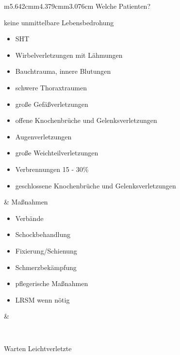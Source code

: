 \documentclass{article}
\begin{document}
\begin{flushleft}
\tablehead{}\begin{supertabular}{m{5.642cm}m{4.379cm}m{3.076cm}}
Welche Patienten?

keine unmittelbare Lebensbedrohung

\begin{itemize}
\item SHT

\item Wirbelverletzungen mit L\"ahmungen

\item Bauchtrauma, innere Blutungen

\item schwere Thoraxtraumen

\item gro{\ss}e Gef\"a{\ss}verletzungen

\item offene Knochenbr\"uche und  Gelenks\-verletzungen

\item Augenverletzungen

\item gro{\ss}e Weichteilverletzungen

\item Verbrennungen 15 - 30\%

\item geschlossene Knochenbr\"uche und Gelenks\-ver\-letzungen

\end{itemize}
 &
Ma{\ss}nahmen

\begin{itemize}
\item Verb\"ande

\item Schockbehandlung

\item Fixierung/Schienung

\item Schmerzbek\"ampfung

\item pflegerische Ma{\ss}nahmen

\item LRSM wenn n\"otig

\end{itemize}
 &
 \par

\\
\end{supertabular}
\end{flushleft}
Warten Leichtverletzte
\end{document}
